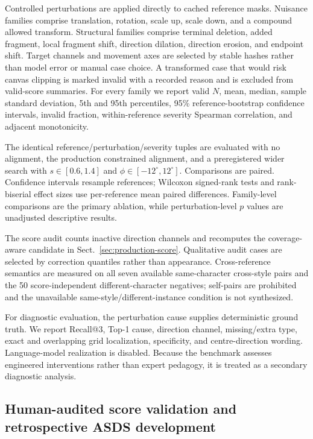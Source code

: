 Controlled perturbations are applied directly to cached reference masks.
Nuisance families comprise translation, rotation, scale up, scale down, and a
compound allowed transform. Structural families comprise terminal deletion,
added fragment, local fragment shift, direction dilation, direction erosion,
and endpoint shift. Target channels and movement axes are selected by stable
hashes rather than model error or manual case choice. A transformed case that
would risk canvas clipping is marked invalid with a recorded reason and is
excluded from valid-score summaries. For every family we report valid \(N\),
mean, median, sample standard deviation, 5th and 95th percentiles, 95\%
reference-bootstrap confidence intervals, invalid fraction, within-reference
severity Spearman correlation, and adjacent monotonicity.

The identical reference/perturbation/severity tuples are evaluated with no
alignment, the production constrained alignment, and a preregistered wider
search with \(s\in[0.6,1.4]\) and
\(\phi\in[-12^\circ,12^\circ]\). Comparisons are paired. Confidence intervals
resample references; Wilcoxon signed-rank tests and rank-biserial effect sizes
use per-reference mean paired differences. Family-level comparisons are the
primary ablation, while perturbation-level \(p\) values are unadjusted
descriptive results.

The score audit counts inactive direction channels and recomputes the
coverage-aware candidate in Sect.~\ref{sec:production-score}. Qualitative
audit cases are selected by correction quantiles rather than appearance.
Cross-reference semantics are measured on all seven available
same-character cross-style pairs and the 50 score-independent
different-character negatives; self-pairs are prohibited and the unavailable
same-style/different-instance condition is not synthesized.

For diagnostic evaluation, the perturbation cause supplies deterministic
ground truth. We report Recall@3, Top-1 cause, direction channel,
missing/extra type, exact and overlapping grid localization, specificity, and
centre-direction wording. Language-model realization is disabled. Because
the benchmark assesses engineered interventions rather than expert pedagogy,
it is treated as a secondary diagnostic analysis.

\subsection{Human-audited score validation and retrospective ASDS development}


